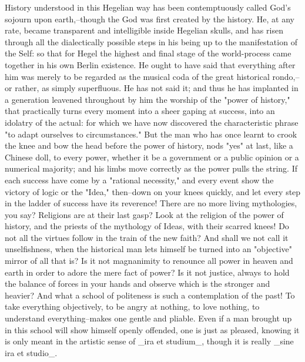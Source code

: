 History understood in this Hegelian way has been contemptuously
called God's sojourn upon earth,--though the God was first created by
the history. He, at any rate, became transparent and intelligible
inside Hegelian skulls, and has risen through all the dialectically
possible steps in his being up to the manifestation of the Self: so
that for Hegel the highest and final stage of the world-process came
together in his own Berlin existence. He ought to have said that
everything after him was merely to be regarded as the musical coda of
the great historical rondo,--or rather, as simply superfluous. He has
not said it; and thus he has implanted in a generation leavened
throughout by him the worship of the "power of history," that
practically turns every moment into a sheer gaping at success, into
an idolatry of the actual: for which we have now discovered the
characteristic phrase "to adapt ourselves to circumstances." But the
man who has once learnt to crook the knee and bow the head before the
power of history, nods "yes" at last, like a Chinese doll, to every
power, whether it be a government or a public opinion or a numerical
majority; and his limbs move correctly as the power pulls the string.
If each success have come by a "rational necessity," and every event
show the victory of logic or the "Idea," then--down on your knees
quickly, and let every step in the ladder of success have its
reverence! There are no more living mythologies, you say? Religions
are at their last gasp? Look at the religion of the power of history,
and the priests of the mythology of Ideas, with their scarred knees!
Do not all the virtues follow in the train of the new faith? And
shall we not call it unselfishness, when the historical man lets
himself be turned into an "objective" mirror of all that is? Is it
not magnanimity to renounce all power in heaven and earth in order to
adore the mere fact of power? Is it not justice, always to hold the
balance of forces in your hands and observe which is the stronger and
heavier? And what a school of politeness is such a contemplation of
the past! To take everything objectively, to be angry at nothing, to
love nothing, to understand everything--makes one gentle and pliable.
Even if a man brought up in this school will show himself openly
offended, one is just as pleased, knowing it is only meant in the
artistic sense of _ira et studium_, though it is really _sine ira et
studio_.

